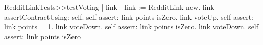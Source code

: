 \documentclass[a4paper,10pt,twoside]{book}
\begin{document}
\begin{code}{}
RedditLinkTests>>testVoting
    | link | 
    link := RedditLink new. 
    link assertContractUsing: self. 
    self assert: link points isZero. link voteUp. 
    self assert: link points = 1. 
    link voteDown. self assert: 
    link points isZero. 
    link voteDown. 
    self assert: link points isZero
\end{code}


\section{}
\section{}

\section{}
\section{}
\section{}

\section{}
\section{}

\section{}


\ifx\wholebook\relax\else
    
    
\end{document}
